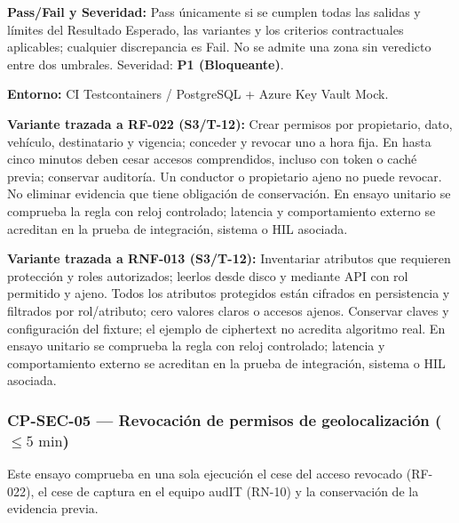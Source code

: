 \par\noindent\textbf{Pass/Fail y Severidad:} Pass únicamente si se cumplen todas las salidas y límites del Resultado Esperado, las variantes y los criterios contractuales aplicables; cualquier discrepancia es Fail. No se admite una zona sin veredicto entre dos umbrales. Severidad: \textbf{P1 (Bloqueante)}.\par
\par\noindent\textbf{Entorno:} CI Testcontainers / PostgreSQL + Azure Key Vault Mock.\par







\par\noindent\textbf{Variante trazada a RF-022 (S3/T-12):} Crear permisos por propietario, dato, vehículo, destinatario y vigencia; conceder y revocar uno a hora fija. En hasta cinco minutos deben cesar accesos comprendidos, incluso con token o caché previa; conservar auditoría. Un conductor o propietario ajeno no puede revocar. No eliminar evidencia que tiene obligación de conservación. En ensayo unitario se comprueba la regla con reloj controlado; latencia y comportamiento externo se acreditan en la prueba de integración, sistema o HIL asociada.\par

\par\noindent\textbf{Variante trazada a RNF-013 (S3/T-12):} Inventariar atributos que requieren protección y roles autorizados; leerlos desde disco y mediante API con rol permitido y ajeno. Todos los atributos protegidos están cifrados en persistencia y filtrados por rol/atributo; cero valores claros o accesos ajenos. Conservar claves y configuración del fixture; el ejemplo de ciphertext no acredita algoritmo real. En ensayo unitario se comprueba la regla con reloj controlado; latencia y comportamiento externo se acreditan en la prueba de integración, sistema o HIL asociada.\par
\subsubsection*{CP-SEC-05 — Revocación de permisos de geolocalización (\(\le 5\text{ min}\))}\label{sec:9-cp-sec-05}
Este ensayo comprueba en una sola ejecución el cese del acceso revocado (RF-022), el cese de captura en el equipo audIT (RN-10) y la conservación de la evidencia previa.

